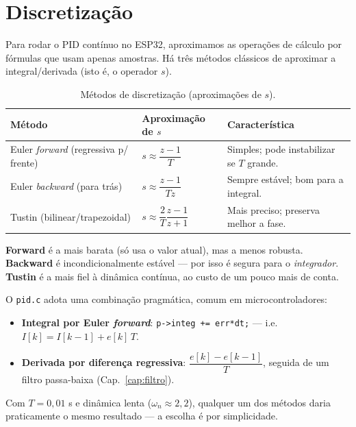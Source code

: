\chapter{Discretiza\c{c}\~ao}\label{cap:discret}

Para rodar o PID cont\'inuo no ESP32, aproximamos as opera\c{c}\~oes de
c\'alculo por f\'ormulas que usam apenas amostras. H\'a tr\^es m\'etodos cl\'assicos
de aproximar a integral/derivada (isto \'e, o operador $s$).

\begin{table}[h]\centering
\caption{M\'etodos de discretiza\c{c}\~ao (aproxima\c{c}\~oes de $s$).}
\label{tab:discret}
\small
\begin{tabularx}{\textwidth}{l l X}
\toprule
M\'etodo & Aproxima\c{c}\~ao de $s$ & Caracter\'istica \\
\midrule
Euler \emph{forward} (regressiva p/ frente) & $s\approx\dfrac{z-1}{T}$ &
Simples; pode instabilizar se $T$ grande. \\
Euler \emph{backward} (para tr\'as) & $s\approx\dfrac{z-1}{Tz}$ &
Sempre est\'avel; bom para a integral. \\
Tustin (bilinear/trapezoidal) & $s\approx\dfrac{2}{T}\dfrac{z-1}{z+1}$ &
Mais preciso; preserva melhor a fase. \\
\bottomrule
\end{tabularx}
\end{table}

\begin{conceito}
\textbf{Forward} \'e a mais barata (s\'o usa o valor atual), mas a menos robusta.
\textbf{Backward} \'e incondicionalmente est\'avel --- por isso \'e segura para o
\emph{integrador}. \textbf{Tustin} \'e a mais fiel \`a din\^amica cont\'inua, ao
custo de um pouco mais de conta.
\end{conceito}

\begin{projeto}
O \texttt{pid.c} adota uma combina\c{c}\~ao pragm\'atica, comum em
microcontroladores:
\begin{itemize}[leftmargin=1.4em]
  \item \textbf{Integral por Euler \emph{forward}}: \texttt{p->integ += err*dt;}
  --- i.e.\ $I[k]=I[k-1]+e[k]\,T$.
  \item \textbf{Derivada por diferen\c{c}a regressiva}: $\dfrac{e[k]-e[k-1]}{T}$,
  seguida de um filtro passa-baixa (Cap.~\ref{cap:filtro}).
\end{itemize}
Com $T=0{,}01$ s e din\^amica lenta ($\omega_n\!\approx\!2{,}2$), qualquer um dos
m\'etodos daria praticamente o mesmo resultado --- a escolha \'e por simplicidade.
\end{projeto}

